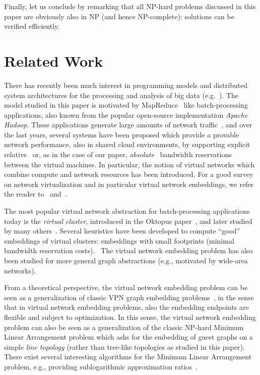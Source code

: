 \documentclass[9pt]{sigcomm-alternate}
\begin{document}
Finally, let us conclude by remarking that all NP-hard problems discussed in this paper
are obviously also in NP (and hence NP-complete): solutions can be verified efficiently.

\section{Related Work}\label{sec:relwork}

There has recently been much interest in programming models and distributed
system architectures for the processing and analysis of big data (e.g.~\cite{nodb,mapreduce,shark}). The model studied in
this paper is motivated by MapReduce~\cite{mapreduce} like batch-processing applications, also known
from the popular open-source implementation \emph{Apache Hadoop}.
These applications
generate large amounts of network traffic~\cite{orchestra,talk-about,amazonbw},
and over the last years, several systems have been proposed which provide
a provable network performance, also in shared cloud environments, by supporting explicit
relative~\cite{faircloud,elasticswitch,seawall}
or, as in the case of our paper, \emph{absolute}~\cite{oktopus,secondnet,drl,gatekeeper,proteus} bandwidth reservations
between the virtual machines.
In particular, the notion of virtual networks which combine compute and network resources has been introduced.
For a good survey on network virtualization and in particular virtual network embeddings,
we refer the reader to~\cite{boutaba-survey} and~\cite{fischer-survey}.

The most popular virtual network abstraction for batch-processing applications today is the \emph{virtual cluster},
introduced in the Oktopus paper~\cite{oktopus}, and later studied by many others~\cite{talk-about,proteus}.
Several heuristics have been developed to compute ``good'' embeddings of virtual clusters: embeddings
with small footprints (minimal bandwidth reservation costs).~\cite{oktopus,talk-about,proteus}
The virtual network embedding problem has also been studied for more general graph abstractions
(e.g., motivated by wide-area networks).~\cite{infocom2009,ammar,turner,simannealing,ucc12mip,zhu06}

From a theoretical perspective, the virtual network embedding problem can be seen as a generalization
of classic VPN graph embedding problems~\cite{Goyal2008,gupta2001provisioning},
in the sense that in virtual network embedding problems, also the embedding endpoints are flexible and subject to optimization.
In this sense, the virtual network embedding problem can also be seen as a generalization of the
classic NP-hard Minimum Linear Arrangement problem which asks for the
embedding of guest graphs on a simple \emph{line topology} (rather than tree-like topologies as
studied in this paper).~\cite{mla,mla-survey}
There exist several interesting algorithms for the Minimum Linear Arrangement problem,
e.g., providing sublogarithmic approximation ratios~\cite{mla-feige}.
\end{document}
